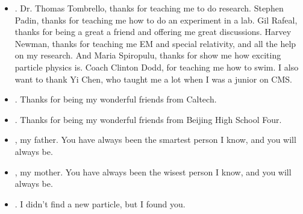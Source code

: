 \begin{itemize}
	\item {}. Dr. Thomas Tombrello, thanks for teaching me to do research. Stephen Padin, thanks for teaching me how to do an experiment in a lab. Gil Rafeal, thanks for being a great a friend and offering me great discussions. Harvey Newman, thanks for teaching me EM and special relativity, and all the help on my research. And Maria Spiropulu, thanks for show me how exciting particle physics is. Coach Clinton Dodd, for teaching me how to swim. I also want to thank Yi Chen, who taught me a lot when I was a junior on CMS.
	\item {}. Thanks for being my wonderful friends from Caltech.
	\item {}. Thanks for being my wonderful friends from Beijing High School Four.
	\item {}, my father. You have always been the smartest person I know, and you will always be.
	\item {}, my mother. You have always been the wisest person I know, and you will always be.
	\item {}. I didn't find a new particle, but I found you.
\end{itemize}



